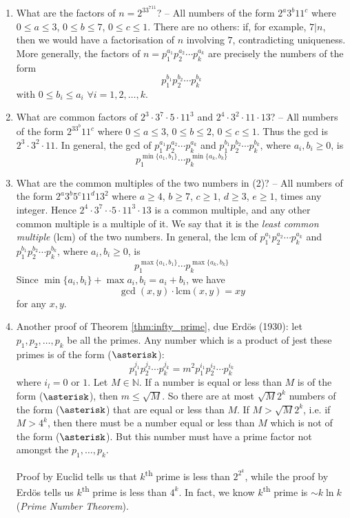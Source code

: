 \documentclass[10pt, a4paper, twoside]{report}
\begin{document}
\begin{enumerate}
    \item What are the factors of \(n=2^33^711\)? -- All numbers of the form \(2^a3^b{11}^c\) where \(0\leq a\leq 3\), \(0\leq b\leq 7\), \(0\leq c\leq 1\). There are no others: if, for example, \(7|n\), then we would have a factorisation of \(n\) involving \(7\), contradicting uniqueness. More generally, the factors of \(n=p_1^{a_1}p_2^{a_2}\cdots p_k^{a_k}\) are precisely the numbers of the form 
    \[p_1^{b_1}p_2^{b_2}\cdots p_k^{b_k}\]
    with \(0\leq b_i\leq a_i\) \(\forall i=1,2,\ldots,k\).
    \item What are common factors of \(2^3\cdot 3^7\cdot5\cdot11^3\) and \(2^4\cdot 3^2\cdot 11\cdot 13\)? -- All numbers of the form \(2^33^b11^c\) where \(0\leq a\leq 3\), \(0\leq b\leq 2\), \(0\leq c\leq 1\). Thus the gcd is \(2^3\cdot 3^2\cdot 11\). In general, the gcd of \(p_1^{a_1}p_2^{a_2}\cdots p_k^{a_k}\) and \(p_1^{b_1}p_2^{b_2}\cdots p_k^{b_k}\), where \(a_i, b_i\geq 0\), is 
    \[p_1^{\min\{a_1,b_1\}}\cdots p_k^{\min\{a_k,b_k\}}\]
    \item What are the common multiples of the two numbers in (2)? -- All numbers of the form \(2^a3^b5^c11^d13^2\) where \(a\geq 4\), \(b\geq 7\), \(c\geq 1\), \(d\geq 3\), \(e\geq 1\), times any integer. Hence \(2^4\cdot 3^7\cdot\cdot 5\cdot 11^3\cdot 13\) is a common multiple, and any other common multiple is a multiple of it. We say that it is the \emph{least common multiple} (lcm) of the two numbers.  In general, the lcm of \(p_1^{a_1}p_2^{a_2}\cdots p_k^{a_k}\) and \(p_1^{b_1}p_2^{b_2}\cdots p_k^{b_k}\), where \(a_i, b_i\geq 0\), is 
    \[p_1^{\max\{a_1,b_1\}}\cdots p_k^{\max\{a_k,b_k\}}\]
    Since \(\min\{a_i,b_i\}+\max{a_i,b_i}=a_i+b_i\), we have 
    \[\gcd(x,y)\cdot\text{lcm}(x,y)=xy\]
    for any \(x,y\).
    \item Another proof of Theorem \ref{thm:infty_prime}, due Erdös (1930): let \(p_1,p_2,\ldots,p_k\) be all the primes. Any number which is a product of jest these primes is of the form (\(\asterisk\)):
    \[p_1^{j_1}p_2^{j_2}\cdots p_k^{j_k}=m^2p_1^{i_1}p_2^{i_2}\cdots p_k^{i_k}\]
    where \(i_l=0\text{ or }1\). Let \(M\in\mathbb{N}\). If a number is equal or less than \(M\) is of the form (\(\asterisk\)), then \(m\leq\sqrt{M}\). So there are at most \(\sqrt{M}2^k\) numbers of the form (\(\asterisk\)) that are equal or less than \(M\). If \(M>\sqrt{M}2^k\), i.e. if \(M>4^k\), then there must be a number equal or less than \(M\) which is not of the form (\(\asterisk\)). But this number must have a prime factor not amongst the \(p_1,\ldots,p_k\). \hfill\qedsymbol
    
    Proof by Euclid tells us that \(k\)\textsuperscript{th} prime is less than \(2^{2^k}\), while the proof by Erdös tells us \(k\)\textsuperscript{th} prime is less than \(4^k\). In fact, we know \(k\)\textsuperscript{th} prime is \(\sim k\ln k\) (\emph{Prime Number Theorem}).
\end{enumerate}
\end{document}
